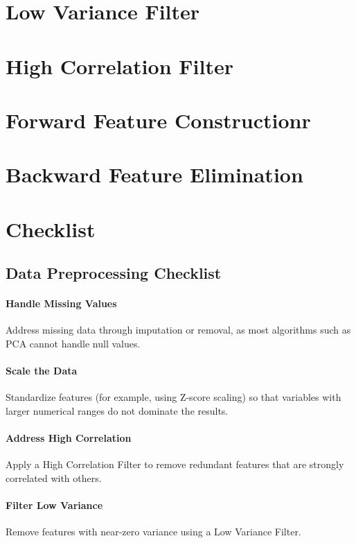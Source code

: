 \section{Low Variance Filter}
\section{High Correlation Filter}
\section{Forward Feature Constructionr}
\section{Backward Feature Elimination}


\section{Checklist}
        \subsection{Data Preprocessing Checklist}
            
            \paragraph{Handle Missing Values}
                Address missing data through imputation or removal, as most algorithms such as PCA cannot handle null values.
            
            \paragraph{Scale the Data}
                Standardize features (for example, using Z-score scaling) so that variables with larger numerical ranges do not dominate the results.
            
            \paragraph{Address High Correlation}
                Apply a High Correlation Filter to remove redundant features that are strongly correlated with others.
            
            \paragraph{Filter Low Variance}
                Remove features with near-zero variance using a Low Variance Filter.
    
